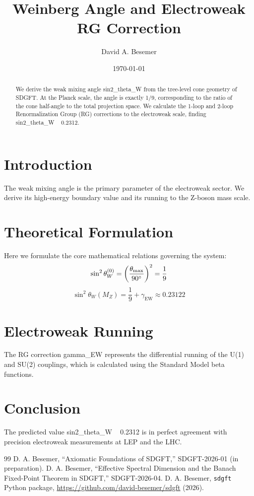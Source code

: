 \documentclass[amsmath,amssymb,aps,prd,twocolumn,superscriptaddress,nofootinbib]{revtex4-2}
\begin{document}

\title{Weinberg Angle and Electroweak RG Correction}

\author{David A. Besemer}

\date{\today}

\begin{abstract}
We derive the weak mixing angle sin2_theta_W from the tree-level cone geometry of SDGFT. At the Planck scale, the angle is exactly 1/9, corresponding to the ratio of the cone half-angle to the total projection space. We calculate the 1-loop and 2-loop Renormalization Group (RG) corrections to the electroweak scale, finding sin2_theta_W ~ 0.2312.
\end{abstract}

\maketitle

\section{Introduction}
The weak mixing angle is the primary parameter of the electroweak sector. We derive its high-energy boundary value and its running to the Z-boson mass scale.

\section{Theoretical Formulation}
Here we formulate the core mathematical relations governing the system:
\begin{equation}
  \sin^2\theta_W^{(0)} = \left(\frac{\theta_{\mathrm{max}}}{90^\circ}\right)^2 = \frac{1}{9}
\end{equation}
\begin{equation}
  \sin^2\theta_W(M_Z) = \frac{1}{9} + \gamma_{\text{EW}} \approx 0.23122
\end{equation}
\section{Electroweak Running}
The RG correction gamma_EW represents the differential running of the U(1) and SU(2) couplings, which is calculated using the Standard Model beta functions.

\section{Conclusion}
The predicted value sin2_theta_W ~ 0.2312 is in perfect agreement with precision electroweak measurements at LEP and the LHC.



\begin{thebibliography}{99}
 D. A. Besemer, ``Axiomatic Foundations of SDGFT,'' SDGFT-2026-01 (in preparation).
 D. A. Besemer, ``Effective Spectral Dimension and the Banach Fixed-Point Theorem in SDGFT,'' SDGFT-2026-04.
 D. A. Besemer, \texttt{sdgft} Python package, \url{https://github.com/david-besemer/sdgft} (2026).
\end{thebibliography}
\end{document}
